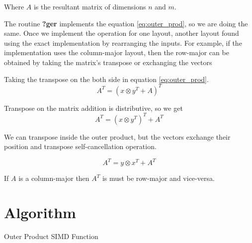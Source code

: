 Where $A$ is the resultant matrix of dimensions $n$ and $m$.

The routine \textbf{?ger} implements the equation \ref{eq:outer_prod}, 
so we are doing the same. Once we implement the operation for one layout, 
another layout found using the exact implementation by rearranging 
the inputs. For example, if the implementation uses the column-major 
layout, then the row-major can be obtained by taking the matrix's 
transpose or exchanging the vectors

Taking the transpose on the both side in equation \ref{eq:outer_prod}.
\[A^T = (x \otimes y^T + A)^T\]

Transpose on the matrix addition is distributive, so we get
\[A^T = (x \otimes y^T)^T + A^T\]

We can transpose inside the outer product, but the vectors exchange 
their position and transpose self-cancellation operation.

\begin{equation}
    A^T = y \otimes x^T + A^T
    \label{eq:outer_prod_trans}
\end{equation}

If $A$ is a column-major then $A^T$ is must be row-major and vice-versa.

\section{Algorithm}

\begin{figure}[htb]
    \centering
\end{figure}

\begin{algorithm}[H]
    \SetAlgoLined

    \caption{Outer Product SIMD Function}
\end{algorithm}

